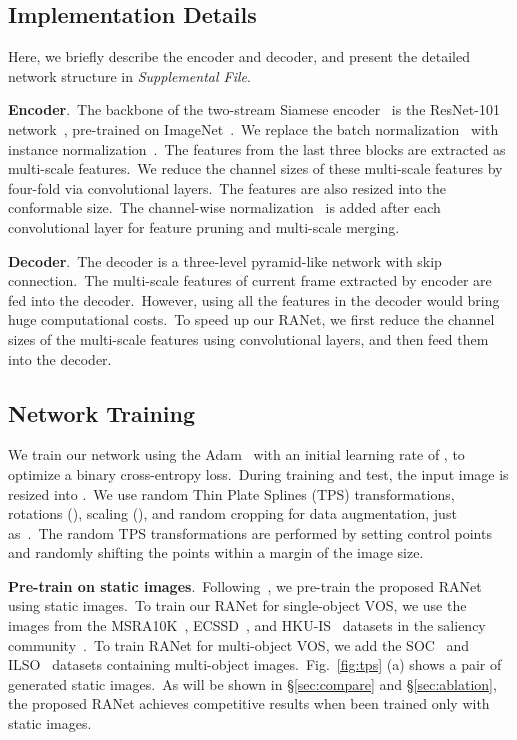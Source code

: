 \documentclass[10pt,twocolumn,letterpaper]{article}
\begin{document}
\subsection{Implementation Details}
\label{sec:imple}
Here, we briefly describe the encoder and decoder, and present the detailed network structure in \textsl{Supplemental File}.

\noindent
\textbf{Encoder}.\ The backbone of the two-stream Siamese encoder~\cite{siamfc} is the ResNet-101 network~\cite{resnet}, pre-trained on ImageNet~\cite{imagenet}.\ We replace the batch normalization~\cite{bn2015} with instance normalization~\cite{in2016}.\ The features from the last three blocks are extracted as multi-scale features.\ We reduce the channel sizes of these multi-scale features by four-fold via convolutional layers.\ The features are also resized into the conformable size.\ The  channel-wise normalization~\cite{hoffer2018norm} is added after each convolutional layer for feature pruning and multi-scale merging. 

\noindent
\textbf{Decoder}.\ The decoder is a three-level pyramid-like network with skip connection.\
The multi-scale features of current frame extracted by encoder are fed into the decoder.\
However, using all the features in the decoder would bring huge computational costs.\ To speed up our RANet, we first reduce the channel sizes of the multi-scale features using convolutional layers, and then feed them into the decoder.\ 








\subsection{Network Training}
\label{sec:train}
We train our network using the Adam~\cite{adam} with an initial learning rate of , to optimize a binary cross-entropy loss.\ During training and test, the input image is resized into .\ We use random Thin Plate Splines (TPS) transformations, rotations (), scaling (), and random cropping for data augmentation, just as~\cite{masktrack}.\ The random TPS transformations are performed by setting  control points and randomly shifting the points within a  margin of the image size. 








\noindent
\textbf{Pre-train on static images}.\
Following~\cite{masktrack}, we pre-train the proposed RANet using static images.\ To train our RANet for single-object VOS, we use the images from the MSRA10K~\cite{msra10k}, ECSSD~\cite{ecssd}, and HKU-IS~\cite{hku} datasets in the saliency community~\cite{fan2019rethinking,Zhao2019RgbdSal,Fan2019VideoSal,Zhao2019ebd,un03,Lu_2019_CVPR}.\ To train RANet for multi-object VOS, we add the SOC~\cite{soc} and ILSO~\cite{ilso} datasets containing multi-object images.\ Fig.~\ref{fig:tps} (a) shows a pair of generated static images.\ As will be shown in \S\ref{sec:compare} and \S\ref{sec:ablation}, the proposed RANet achieves competitive results when been trained only with static images.
\end{document}
